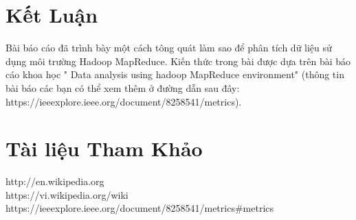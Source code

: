 \documentclass{hcmutarticle}
\begin{document}
	
	
	\section{Kết Luận }\label{result}
	Bài báo cáo đã trình bày một cách tông quát làm sao để phân tích dữ liệu sử dụng môi trường Hadoop MapReduce. Kiến thức trong bài được dựa trên bài báo cáo khoa học " Data analysis using hadoop MapReduce environment" (thông tin bài báo các bạn có thể xem thêm ở đường dẫn sau đây: https://ieeexplore.ieee.org/document/8258541/metrics).
	
	\section{Tài liệu Tham Khảo }
	http://en.wikipedia.org\\
	https://vi.wikipedia.org/wiki\\
	https://ieeexplore.ieee.org/document/8258541/metrics\#metrics\\
	
	
\end{document}
